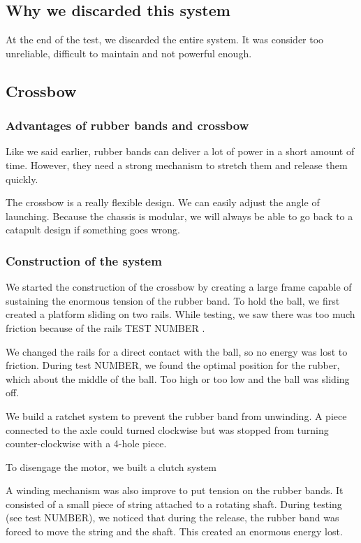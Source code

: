 \documentclass[]{article}
\begin{document}
\subsection{Why we discarded this system}
At the end of the test, we discarded the entire system.  It was consider too unreliable, difficult to maintain and not powerful enough.   

\subsection{Crossbow}
\subsubsection{Advantages of rubber bands and crossbow}
Like we said earlier, rubber bands can deliver a lot of power in a short amount of time.  However, they need a strong mechanism to stretch them and release them quickly.  

The crossbow is a really flexible design.  We can easily adjust the angle of launching.  Because the chassis is modular, we will always be able to go back to a catapult design if something goes wrong. 

\subsubsection{Construction of the system}
We started the construction of the crossbow by creating a large frame capable of sustaining the enormous tension of the rubber band.  To hold the ball, we first created a platform sliding on two rails.  While testing, we saw there was too much friction because of the rails TEST NUMBER .  

We changed the rails for a direct contact with the ball, so no energy was lost to friction.  During test NUMBER, we  found the optimal position for the rubber, which about the middle of the ball.  Too high or too low and the ball was sliding off.   

We build a ratchet system to prevent the rubber band from unwinding.  A piece connected to the axle could turned clockwise but was stopped from turning counter-clockwise with a 4-hole piece.

To disengage the motor, we built a clutch system   

A winding mechanism was also improve to put tension on the rubber bands.  It consisted of a small piece of string attached to a rotating shaft.  During testing (see test NUMBER), we noticed that during the release, the rubber band was forced to move the string and the shaft.  This created an enormous energy lost.
\end{document}
